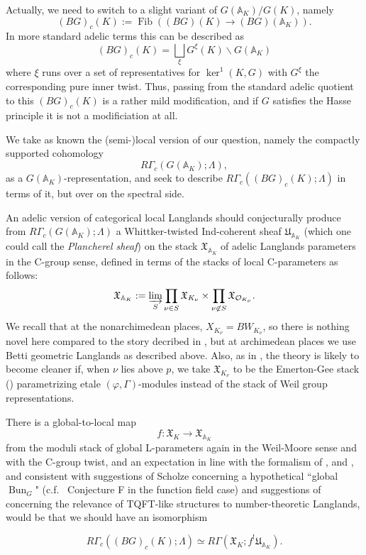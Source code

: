 \documentclass[12pt]{article}
\theoremstyle{definition}
\newcommand{\on}{\operatorname}
\newcommand{\mc}{\mathcal}
\newcommand{\mbb}{\mathbb}
\begin{document}
\begin{enumerate}
Actually, we need to switch to a slight variant of $G(\mbb{A}_K)/G(K)$, namely
$$(BG)_c(K) := \on{Fib}((BG)(K) \to (BG)(\mbb{A}_K)).$$
In more standard adelic terms this can be described as
$$(BG)_c(K) = \bigsqcup_\xi G^\xi(K)\backslash G(\mbb{A}_K)$$
where $\xi$ runs over a set of representatives for $\on{ker}^1(K,G)$ with $G^\xi$ the corresponding pure inner twist.  Thus, passing from the standard adelic quotient to this $(BG)_c(K)$ is a rather mild modification, and if $G$ satisfies the Hasse principle it is not a modificiation at all.

We take as known the (semi-)local version of our question, namely the compactly supported cohomology
$$R\Gamma_c(G(\mbb{A}_K);\Lambda),$$
as a $G(\mbb{A}_K)$-representation, and seek to describe $R\Gamma_c((BG)_c(K);\Lambda)$ in terms of it, but over on the spectral side.

An adelic version of categorical local Langlands should conjecturally produce from $R\Gamma_c(G(\mbb{A}_K);\Lambda)$ a Whittker-twisted Ind-coherent sheaf $\mathfrak{U}_{\mbb{A}_K}$ (which one could call the \emph{Plancherel sheaf}) on the stack
$\mathfrak{X}_{\mbb{A}_K}$ of adelic Langlands parameters in the C-group sense, defined in terms of the stacks of local C-parameters as follows:
$$\mathfrak{X}_{\mbb{A}_K} := \varinjlim_S \prod_{\nu\in S}\mathfrak{X}_{K_\nu} \times \prod_{\nu\not\in S} \mathfrak{X}_{\mc{O}_{K_\nu}}.$$
We recall that at the nonarchimedean places, $X_{K_\nu}=BW_{K_\nu}$, so there is nothing novel here compared to the story decribed in \cite{egh}, but at archimedean places we use Betti geometric Langlands as described above.  Also, as in \cite{egh}, the theory is likely to become cleaner if, when $\nu$ lies above $p$, we take $\mathfrak{X}_{K_\nu}$ to be the Emerton-Gee stack (\cite{emertongee}) parametrizing etale $(\varphi,\Gamma)$-modules instead of the stack of Weil group representations.

There is a global-to-local map
$$f:\mathfrak{X}_{K} \to \mathfrak{X}_{\mbb{A}_K}$$
from the moduli stack of global L-parameters again in the Weil-Moore sense and with the C-group twist, and an expectation in line with the formalism of \cite{egh}, \cite{zhu} and \cite{locsysres}, and consistent with suggestions of Scholze concerning a hypothetical ``global $\on{Bun}_G$" (c.f.\ \cite{slh} Conjecture F in the function field case) and suggestions of \cite{bzsv} concerning the relevance of TQFT-like structures to number-theoretic Langlands, would be that we should have an isomorphism

$$R\Gamma_c((BG)_c(K);\Lambda) \simeq R\Gamma(\mathfrak{X}_K; f^!\mathfrak{U}_{\mbb{A}_K}).$$


\end{enumerate}
\end{document}
